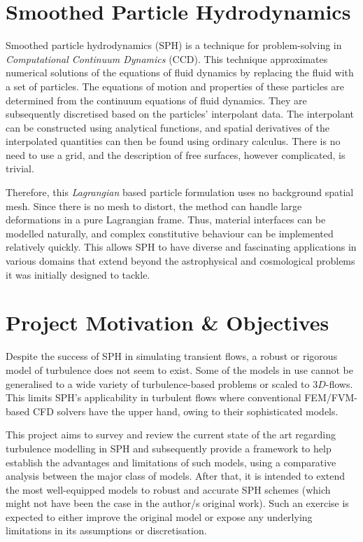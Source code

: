 \section{Smoothed Particle Hydrodynamics}
Smoothed particle hydrodynamics (SPH) is a technique for problem-solving in \textit{Computational Continuum Dynamics} (CCD). This technique approximates numerical solutions of the equations of fluid dynamics by replacing the fluid with a set of particles. The equations of motion and properties of these particles are determined from the continuum equations of fluid dynamics. They are subsequently discretised based on the particles' interpolant data. The interpolant can be constructed using analytical functions, and spatial derivatives of the interpolated quantities can then be found using ordinary calculus. There is no need to use a grid, and the description of free surfaces, however complicated, is trivial.

Therefore, this \textit{Lagrangian} based particle formulation uses no background spatial mesh. Since there is no mesh to distort, the method can handle large deformations in a pure Lagrangian frame. Thus, material interfaces can be modelled naturally, and complex constitutive behaviour can be implemented relatively quickly. This allows SPH to have diverse and fascinating applications in various domains that extend beyond the astrophysical and cosmological problems it was initially designed to tackle.

\section{Project Motivation \& Objectives}
Despite the success of SPH in simulating transient flows, a robust or rigorous model of turbulence does not seem to exist. Some of the models in use cannot be generalised to a wide variety of turbulence-based problems or scaled to $3D$-flows.
This limits SPH's applicability in turbulent flows where conventional FEM/FVM-based CFD solvers have the upper hand, owing to their sophisticated models.

This project aims to survey and review the current state of the art regarding turbulence modelling in SPH and subsequently provide a framework to help establish the advantages and limitations of such models, using a comparative analysis between the major class of models.
After that, it is intended to extend the most well-equipped models to robust and accurate SPH schemes (which might not have been the case in the author/s original work). Such an exercise is expected to either improve the original model or expose any underlying limitations in its assumptions or discretisation.

